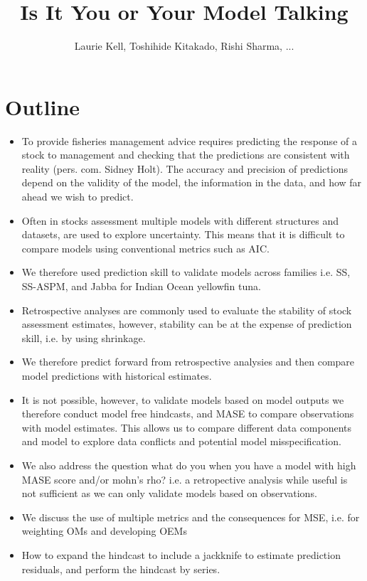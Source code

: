 \documentclass[a4paper]{article}
\title{Is It You or Your Model Talking}
\author{Laurie Kell, Toshihide Kitakado, Rishi Sharma, ...}
\begin{document}
\maketitle

\newpage       
\section*{Outline}

\begin{itemize}
    \item To provide fisheries management advice requires predicting the response of a stock to management and checking that the predictions are consistent with reality (pers. com. Sidney Holt). The accuracy and precision of predictions depend on the validity of the model, the information in the data, and how far ahead we wish to predict. 
    \item Often in stocks assessment multiple models with different structures and datasets, are used to explore uncertainty. This means that it is difficult to compare models using conventional metrics such as AIC.  
    \item We therefore used prediction skill to validate models across families i.e. SS, SS-ASPM, and Jabba for Indian Ocean yellowfin tuna. 
    \item Retrospective analyses are commonly used to evaluate the stability of stock assessment estimates, however, stability can be at the expense of prediction skill, i.e. by using shrinkage.
    \item We therefore predict forward from retrospective analysies and then compare model predictions with historical estimates.
    \item It is not possible, however, to validate models based on model outputs we therefore conduct model free hindcasts, and MASE to compare observations with model estimates. This allows us to compare different data components and model to explore data conflicts and potential model misspecification.
    \item We also address the question what do you when you have a model with high MASE score and/or mohn’s rho? i.e. a retropective analysis while useful is not sufficient as we can only validate models based on observations.
    \item  We discuss the use of multiple metrics and the consequences for MSE, i.e. for weighting OMs and developing OEMs    
    \item How to expand the hindcast to include a jackknife to estimate prediction residuals, and perform the hindcast by series.
\end{itemize}
\end{document}
